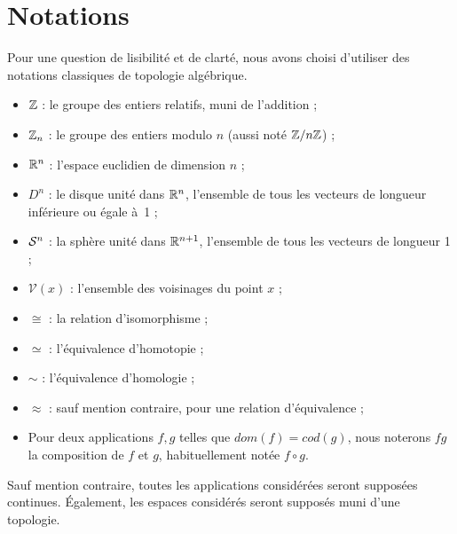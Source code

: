 \section{Notations}
Pour une question de lisibilité et de clarté, nous avons choisi d'utiliser des notations classiques de topologie algébrique.
\begin{itemize}
    \item $\mathbb{Z}$ : le groupe des entiers relatifs, muni de l'addition ;
    \item $\mathbb{Z}_n$ : le groupe des entiers modulo $n$ (aussi noté $\mathbb{Z}/n\mathbb{Z}$) ;
    \item $\mathbb{R}^n$ : l'espace euclidien de dimension $n$ ;
    \item $D^n$ : le disque unité dans $\mathbb{R}^n$, l'ensemble de tous les vecteurs de longueur inférieure ou égale à~1 ;
    \item $\mathcal{S}^{n}$ : la sphère unité dans $\mathbb{R}^{n+1}$, l'ensemble de tous les vecteurs de longueur 1 ;
    \item $\mathcal{V}(x)$ : l'ensemble des voisinages du point $x$ ;
    \item $\cong$ : la relation d'isomorphisme  ;
    \item $\simeq$ : l'équivalence d'homotopie ;
    \item $\sim$ : l'équivalence d'homologie ;
    \item $\approx$ : sauf mention contraire, pour une relation d'équivalence ;
    \item Pour deux applications $f,g$ telles que $dom(f)=cod(g)$, nous noterons $fg$ la composition de $f$ et $g$, habituellement notée $f\circ g$.
\end{itemize}

Sauf mention contraire, toutes les applications considérées seront supposées continues. Également, les espaces considérés seront supposés muni d'une topologie.